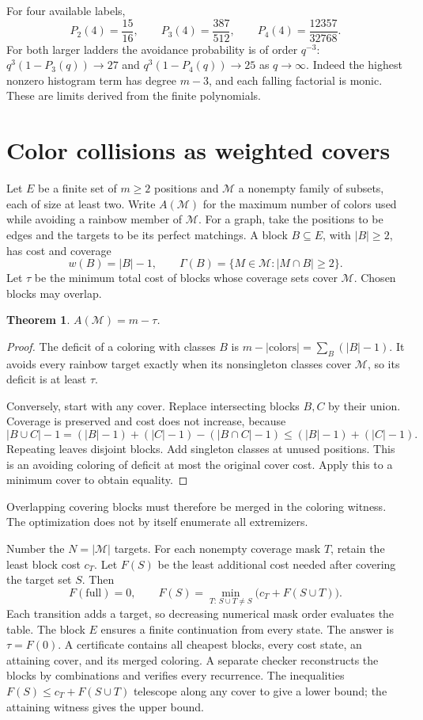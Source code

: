 \documentclass[11pt,letterpaper]{article}
\newtheorem{theorem}{Theorem}
\begin{document}
For four available labels,
\[
 P_2(4)=\frac{15}{16},\qquad
 P_3(4)=\frac{387}{512},\qquad
 P_4(4)=\frac{12357}{32768}.
\]
For both larger ladders the avoidance probability is of order $q^{-3}$:
$q^3(1-P_3(q))\to27$ and $q^3(1-P_4(q))\to25$ as $q\to\infty$.
Indeed the highest nonzero histogram term has degree $m-3$, and each falling
factorial is monic. These are limits derived from the finite polynomials.

\newpage
\section{Color collisions as weighted covers}
Let $E$ be a finite set of $m\ge2$ positions and $\mathcal M$ a nonempty
family of subsets, each of size at least two. Write $A(\mathcal M)$ for the
maximum number of colors used while avoiding a rainbow member of $\mathcal M$.
For a graph, take the positions to be edges and the targets to be its perfect
matchings. A block $B\subseteq E$, with $|B|\ge2$, has cost and coverage
\[
 w(B)=|B|-1,\qquad
 \Gamma(B)=\{M\in\mathcal M:|M\cap B|\ge2\}.
\]
Let $\tau$ be the minimum total cost of blocks whose coverage sets cover
$\mathcal M$. Chosen blocks may overlap.

\begin{theorem}
$A(\mathcal M)=m-\tau$.
\end{theorem}
\begin{proof}
The deficit of a coloring with classes $B$ is
$m-|\text{colors}|=\sum_B(|B|-1)$. It avoids every rainbow target exactly
when its nonsingleton classes cover $\mathcal M$, so its deficit is at
least $\tau$.

Conversely, start with any cover. Replace intersecting blocks $B,C$ by their
union. Coverage is preserved and cost does not increase, because
\[
 |B\cup C|-1
 =(|B|-1)+(|C|-1)-(|B\cap C|-1)
 \le (|B|-1)+(|C|-1).
\]
Repeating leaves disjoint blocks. Add singleton classes at unused positions.
This is an avoiding coloring of deficit at most the original cover cost.
Apply this to a minimum cover to obtain equality.
\end{proof}
Overlapping covering blocks must therefore be merged in the coloring witness.
The optimization does not by itself enumerate all extremizers.

Number the $N=|\mathcal M|$ targets. For each nonempty coverage mask $T$,
retain the least block cost $c_T$. Let $F(S)$ be the least additional cost
needed after covering the target set $S$. Then
\[
 F(\mathrm{full})=0,\qquad
 F(S)=\min_{T:\,S\cup T\ne S}
       \bigl(c_T+F(S\cup T)\bigr).
\]
Each transition adds a target, so decreasing numerical mask order evaluates
the table. The block $E$ ensures a finite continuation from every state.
The answer is $\tau=F(0)$. A certificate contains all cheapest blocks, every
cost state, an attaining cover, and its merged coloring. A separate checker
reconstructs the blocks by combinations and verifies every recurrence.
The inequalities $F(S)\le c_T+F(S\cup T)$ telescope along any cover to give
a lower bound; the attaining witness gives the upper bound.
\end{document}
